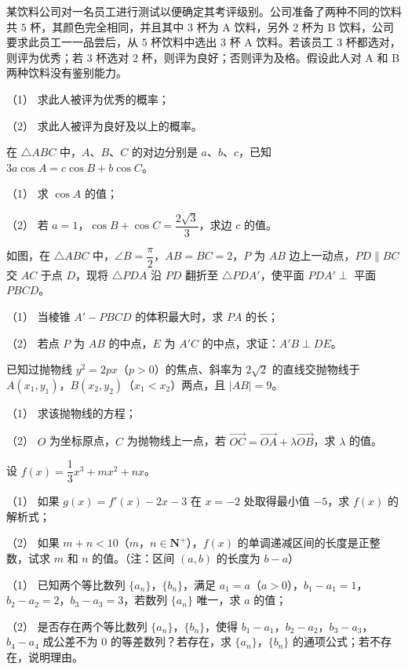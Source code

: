 \begin{question}
某饮料公司对一名员工进行测试以便确定其考评级别。公司准备了两种不同的饮料共 $5$ 杯，其颜色完全相同，并且其中 $3$ 杯为 A 饮料，另外 $2$ 杯为 B 饮料，公司要求此员工一一品尝后，从 $5$ 杯饮料中选出 $3$ 杯 A 饮料。若该员工 $3$ 杯都选对，则评为优秀；若 $3$ 杯选对 $2$ 杯，则评为良好；否则评为及格。假设此人对 A 和 B 两种饮料没有鉴别能力。

（1） 求此人被评为优秀的概率；

（2） 求此人被评为良好及以上的概率。

\end{question}
\begin{question}
在 $\triangle ABC$ 中，$A$、$B$、$C$ 的对边分别是 $a$、$b$、$c$，已知 $3a\cos A=c\cos B+b\cos C$。

（1） 求 $\cos A$ 的值；

（2） 若 $a=1$，$\cos B+\cos C=\dfrac{2\sqrt3}3$，求边 $c$ 的值。

\Needspace{0.4\textheight}
\end{question}
\begin{question}
如图，在 $\triangle ABC$ 中，$\angle B=\dfrac\pi2$，$AB=BC=2$，$P$ 为 $AB$ 边上一动点，$PD\parallel BC$ 交 $AC$ 于点 $D$，现将 $\triangle PDA$ 沿 $PD$ 翻折至 $\triangle PDA'$，使平面 $PDA'\perp$ 平面 $PBCD$。

（1） 当棱锥 $A'-PBCD$ 的体积最大时，求 $PA$ 的长；

（2） 若点 $P$ 为 $AB$ 的中点，$E$ 为 $A'C$ 的中点，求证：$A'B\perp DE$。
\nopagebreak[4]
\begin{center}\end{center}
\nopagebreak[4]
\end{question}
\begin{question}
已知过抛物线 $y^2=2px$（$p>0$）的焦点、斜率为 $2\sqrt2$ 的直线交抛物线于 $A(x_1,y_1)$，$B(x_2,y_2)$（$x_1<x_2$）两点，且 $|AB|=9$。

（1） 求该抛物线的方程；

（2） $O$ 为坐标原点，$C$ 为抛物线上一点，若 $\overrightarrow{OC}=\overrightarrow{OA}+\lambda\overrightarrow{OB}$，求 $\lambda$ 的值。

\end{question}
\begin{question}
设 $f(x)=\dfrac13x^3+mx^2+nx$。

（1） 如果 $g(x)=f'(x)-2x-3$ 在 $x=-2$ 处取得最小值 $-5$，求 $f(x)$ 的解析式；

（2） 如果 $m+n<10$（$m$，$n\in\mathbf N^+$），$f(x)$ 的单调递减区间的长度是正整数，试求 $m$ 和 $n$ 的值。（注：区间 $(a,b)$ 的长度为 $b-a$）

\end{question}
\begin{question}
（1） 已知两个等比数列 $\{a_n\}$，$\{b_n\}$，满足 $a_1=a$（$a>0$），$b_1-a_1=1$，$b_2-a_2=2$，$b_3-a_3=3$，若数列 $\{a_n\}$ 唯一，求 $a$ 的值；

（2） 是否存在两个等比数列 $\{a_n\}$，$\{b_n\}$，使得 $b_1-a_1$，$b_2-a_2$，$b_3-a_3$，$b_4-a_4$ 成公差不为 $0$ 的等差数列？若存在，求 $\{a_n\}$，$\{b_n\}$ 的通项公式；若不存在，说明理由。

\end{question}